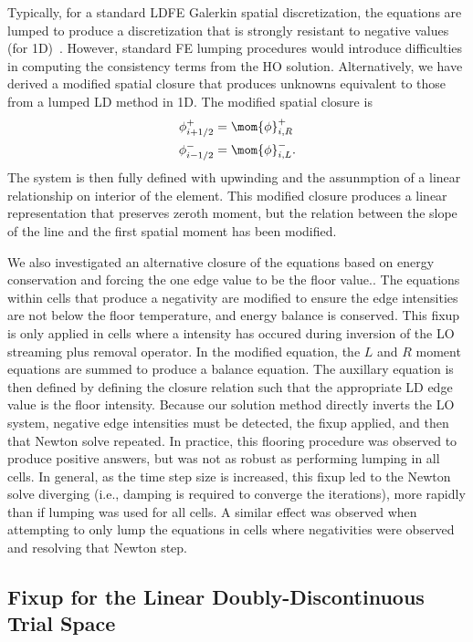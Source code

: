 Typically, for a standard LDFE Galerkin spatial discretization,
the equations are lumped to produce a discretization that is strongly resistant to
negative values (for 1D)~\cite{morel_ldtrt}. However, standard FE lumping
procedures would introduce difficulties in computing the consistency terms from the
HO solution.  Alternatively, we have derived a modified spatial closure that produces
unknowns equivalent to those from a lumped LD method in 1D.  The modified spatial closure
is
\begin{align}
    \phi_{i+1/2}^+ &= \mom{\phi}_{i,R}^+ \\
    \phi_{i-1/2}^- &= \mom{\phi}_{i,L}^-. 
\end{align}
The system is then fully defined with upwinding and the assunmption of a linear relationship on
interior of the element.  This modified closure produces a linear
representation that preserves zeroth moment, but the relation between the slope of the line and the 
first spatial moment has been modified.

We also investigated an alternative closure of the equations based on energy conservation and forcing the 
one edge value to be the floor value..  
The equations within cells that produce a negativity are modified to ensure the edge
intensities are not below the floor temperature, and energy balance is
conserved.  This fixup is only applied in cells where a intensity has occured during
inversion of the LO streaming plus removal operator.  In the modified equation, the $L$
and $R$ moment equations are summed to produce a
balance equation.  The auxillary equation is then defined by defining the closure
relation such that the appropriate LD edge
value is the floor intensity.  Because our solution method directly inverts the LO system,
negative edge intensities must be detected, the fixup applied, and then that Newton solve
repeated.  In practice, this flooring procedure was observed to produce positive answers, but was not as robust as performing
lumping in all cells.  In general, as the time step size is increased, this fixup led to the Newton
solve diverging (i.e., damping is required to converge the iterations), more rapidly than if lumping was
used for all cells.  A similar effect was observed when attempting to only lump the
equations in cells where negativities were observed and resolving that Newton step.

\subsection{Fixup for the Linear Doubly-Discontinuous Trial Space}

